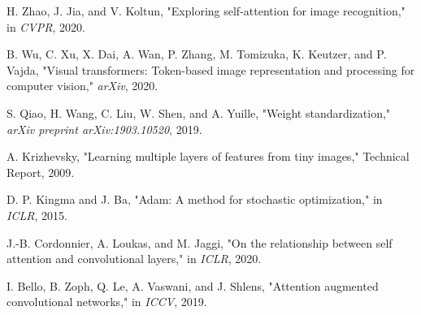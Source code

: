 \begin{thebibliography}{99}
        \item\label{ref18} H. Zhao, J. Jia, and V. Koltun, "Exploring self-attention for image recognition," in \emph{CVPR}, 2020.

        \item\label{ref19} B. Wu, C. Xu, X. Dai, A. Wan, P. Zhang, M. Tomizuka, K. Keutzer, and P. Vajda, "Visual transformers: Token-based image representation and processing for computer vision," \emph{arXiv}, 2020.
        
        \item\label{ref20} S. Qiao, H. Wang, C. Liu, W. Shen, and A. Yuille, "Weight standardization," \emph{arXiv preprint arXiv:1903.10520}, 2019.

        \item\label{ref21} A. Krizhevsky, "Learning multiple layers of features from tiny images," Technical Report, 2009.
        
        \item\label{ref22} D. P. Kingma and J. Ba, "Adam: A method for stochastic optimization," in \emph{ICLR}, 2015.
        
        \item\label{ref23} J.-B. Cordonnier, A. Loukas, and M. Jaggi, "On the relationship between self attention and convolutional layers," in \emph{ICLR}, 2020.
        
        \item\label{ref24} I. Bello, B. Zoph, Q. Le, A. Vaswani, and J. Shlens, "Attention augmented convolutional networks," in \emph{ICCV}, 2019.

\end{thebibliography}